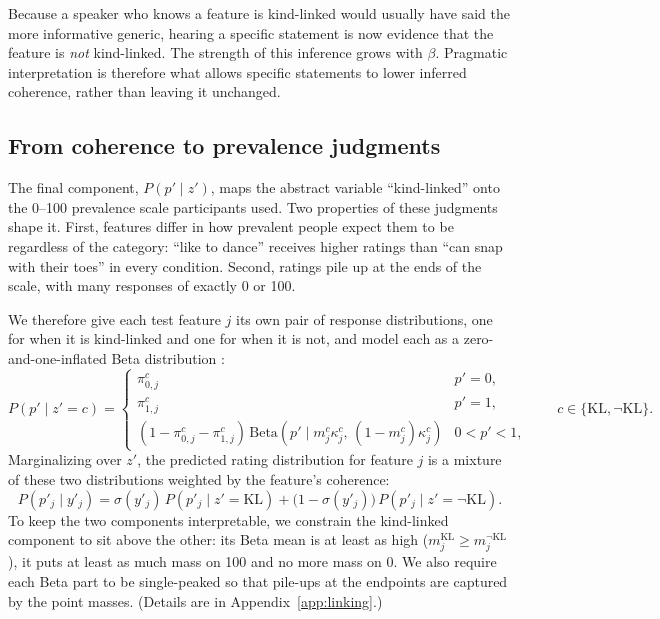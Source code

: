 Because a speaker who knows a feature is kind-linked would usually have said the
more informative generic, hearing a specific statement is now evidence that the
feature is \emph{not} kind-linked. The strength of this inference grows with
$\beta$. Pragmatic interpretation is therefore what allows specific statements
to lower inferred coherence, rather than leaving it unchanged.

\subsection{From coherence to prevalence judgments}
\label{sec:linking}

The final component, $P(p' \mid z')$, maps the abstract variable
``kind-linked'' onto the 0--100 prevalence scale participants used. Two
properties of these judgments shape it. First, features differ in how prevalent
people expect them to be regardless of the category: ``like to dance'' receives
higher ratings than ``can snap with their toes'' in every condition. Second,
ratings pile up at the ends of the scale, with many responses of exactly 0 or
100.

We therefore give each test feature $j$ its own pair of response distributions,
one for when it is kind-linked and one for when it is not, and model each as a
zero-and-one-inflated Beta distribution \citep{ospinaferrari2010inflatedbeta}:
\begin{equation}
    P(p' \mid z' = c) = \begin{cases}
        \pi_{0,j}^{c} & p' = 0, \\
        \pi_{1,j}^{c} & p' = 1, \\
        (1 - \pi_{0,j}^{c} - \pi_{1,j}^{c})\,
            \mathrm{Beta}(p' \mid m_j^{c} \kappa_j^{c},\, (1 - m_j^{c})\kappa_j^{c}) & 0 < p' < 1,
    \end{cases}
    \qquad c \in \{\text{KL}, \neg\text{KL}\}.
\end{equation}
Marginalizing over $z'$, the predicted rating distribution for feature $j$ is a
mixture of these two distributions weighted by the feature's coherence:
\begin{equation}
    P(p'_j \mid y'_j) = \sigma(y'_j)\, P(p'_j \mid z' = \text{KL})
        + \big(1 - \sigma(y'_j)\big)\, P(p'_j \mid z' = \neg\text{KL}).
    \label{eq:linking}
\end{equation}
To keep the two components interpretable, we constrain the kind-linked
component to sit above the other: its Beta mean is at least as high
($m_j^{\text{KL}} \ge m_j^{\neg\text{KL}}$), it puts at least as much mass on
100 and no more mass on 0. We also require each Beta part to be single-peaked so
that pile-ups at the endpoints are captured by the point masses. (Details are in
Appendix~\ref{app:linking}.)

